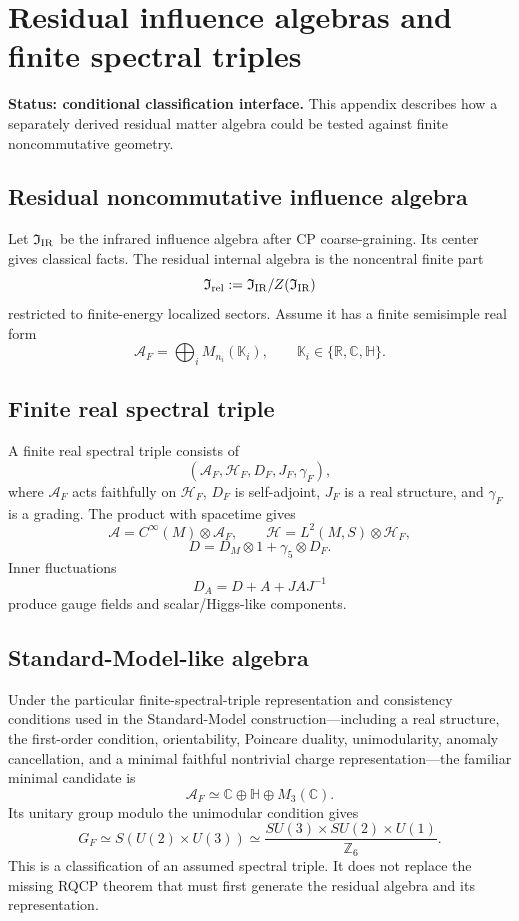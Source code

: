 \documentclass[11pt]{article}
\newcommand{\A}{\mathcal A}
\newcommand{\Hh}{\mathcal H}
\newcommand{\I}{\mathfrak I}
\begin{document}
\section{Residual influence algebras and finite spectral
triples}\label{app:v62-ncg}

\textbf{Status: conditional classification interface.}
This appendix describes how a separately derived residual matter algebra
could be tested against finite noncommutative geometry.

\subsection*{Residual noncommutative influence algebra}

Let $\I_{\rm IR}$ be the infrared influence algebra after CP coarse-graining.  Its center gives classical facts.  The residual internal algebra is the noncentral finite part
\[
\I_{\rm rel}:=\I_{\rm IR}/Z(\I_{\rm IR})
\]
restricted to finite-energy localized sectors.  Assume it has a finite semisimple real form
\[
\A_F=\bigoplus_iM_{n_i}(\mathbb K_i),
\qquad
\mathbb K_i\in\{\mathbb R,\mathbb C,\mathbb H\}.
\]

\subsection*{Finite real spectral triple}

A finite real spectral triple consists of
\[
(\A_F,\Hh_F,D_F,J_F,\gamma_F),
\]
where $\A_F$ acts faithfully on $\Hh_F$, $D_F$ is self-adjoint, $J_F$ is a real structure, and $\gamma_F$ is a grading.  The product with spacetime gives
\[
\A=C^\infty(M)\otimes\A_F,
\qquad
\Hh=L^2(M,S)\otimes\Hh_F,
\]
\[
D=D_M\otimes1+\gamma_5\otimes D_F.
\]
Inner fluctuations
\[
D_A=D+A+JAJ^{-1}
\]
produce gauge fields and scalar/Higgs-like components.

\subsection*{Standard-Model-like algebra}

Under the particular finite-spectral-triple representation and consistency
conditions used in the Standard-Model construction---including a real
structure, the first-order condition, orientability, Poincare duality,
unimodularity, anomaly cancellation, and a minimal faithful nontrivial
charge representation---the familiar minimal candidate is
\cite{ConnesMarcolli,ChamseddineConnes}
\[
\A_F\simeq \mathbb C\oplus\mathbb H\oplus M_3(\mathbb C).
\]
Its unitary group modulo the unimodular condition gives
\[
G_F\simeq S(U(2)\times U(3))
\simeq \frac{SU(3)\times SU(2)\times U(1)}{\mathbb Z_6}.
\]
This is a classification of an assumed spectral triple.  It does not replace
the missing RQCP theorem that must first generate the residual algebra and
its representation.
\end{document}
